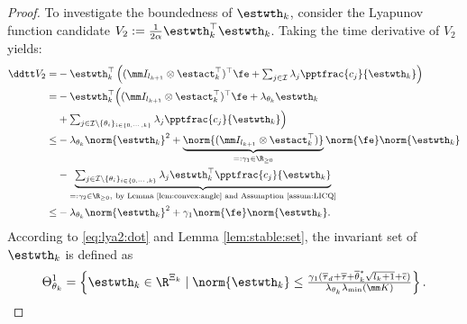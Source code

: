 \documentclass[letterpaper, journal]{IEEEtran}
\begin{document}
\begin{proof}
To investigate the boundedness of $\estwth_k$, consider the Lyapunov function candidate $V_2:=\tfrac{1}{2\alpha}\estwth_k^\top \estwth_k$.
Taking the time derivative of $V_2$ yields:
\begin{equation}
    \begin{aligned}
        \ddtt V_2 
        =& 
        -\estwth_k^\top 
        \left(
            (\mm I_{l_{k+1}}\otimes \estact_k^\top)^\top
            \fe
            +
            \textstyle\sum_{j\in\mathcal{I}}
            \lambda_j 
            \pptfrac{c_j}{\estwth_k}
        \right)
        \\
        =&
        -\estwth_k^\top 
        \Big(
            (\mm I_{l_{k+1}}\otimes \estact_k^\top)^\top
            \fe
            +
            \lambda_{\theta_k}\estwth_k
        \\
        &
            +
            \textstyle\sum_{
                j\in\mathcal{I}\setminus \{\theta_i\}_{i\in\{0,\cdots,k\}}
            }
            \lambda_j 
            \pptfrac{c_j}{\estwth_k}
        \Big)
        \\
        \le&
        -
        \lambda_{\theta_k}\norm{\estwth_k}^2
        +
        \underbrace{
            \norm{(\mm I_{l_{k+1}}\otimes {\estact}_k^\top)}
        }_{=:{\gamma}_1\in\R_{\ge0}}
        \norm{\fe}
        \norm{\estwth_k}
        \\
        &
        -
        \underbrace{
            \textstyle\sum_{
                j\in\mathcal{I}\setminus \{\theta_i\}_{i\in\{0,\cdots,k\}}
            }
            \lambda_j 
            \estwth_k^\top \pptfrac{c_j}{\estwth_k}
        }_{=:{\gamma}_2\in\R_{\ge0},\ \text{by Lemma \ref{lem:convex:angle} and Assumption \ref{assum:LICQ}}}
        \\
        \le&
        -
        \lambda_{\theta_k}\norm{\estwth_k}^2
        +
        {\gamma}_1     
        \norm{\fe}
        \norm{\estwth_k}
        .
    \end{aligned}
    \label{eq:lya2:dot}
\end{equation}
According to \eqref{eq:lya2:dot} and Lemma \ref{lem:stable:set}, the invariant set of $\estwth_k$ is defined as
\begin{equation}
    \Theta_{\theta_k}^{1} 
    = 
    \left\{ 
        \estwth_k \in \R^{\Xi_{k}} 
        \mid 
        \norm{\estwth_k} 
        \le 
        \tfrac{
            {\gamma}_1
            (
                \overline\tau_d
                +
                \overline\tau
                +
                \overline{\theta}^*_k\sqrt{l_{k}+1}
                +
                \overline{\epsilon}
            )
        }{
            \lambda_{\theta_k}\lambda_{\min}(\mm K)
        }
    \right\}
    .
    \label{eq:invariant:c1:wth}
\end{equation}


\end{proof}
\end{document}
